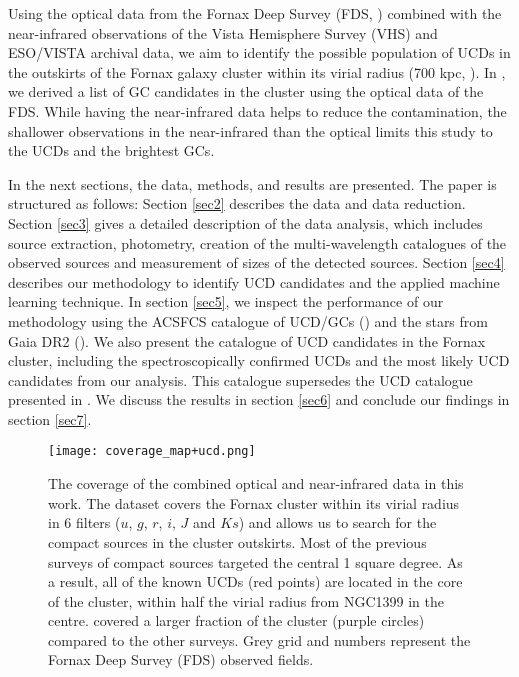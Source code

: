 \documentclass[fleqn,usenatbib]{mnras}
\begin{document}
Using the optical data from the Fornax Deep Survey (FDS, \citealp{Iodice-2016,venhola2018}) combined with the near-infrared observations of the Vista Hemisphere Survey (VHS) and ESO/VISTA archival data, we aim to identify the possible population of UCDs in the outskirts of the Fornax galaxy cluster within its virial radius (700 kpc, \citealp{drinkwater2001}). In \citet{Cantiello2018}, we derived a list of GC candidates in the cluster using the optical data of the FDS. While having the near-infrared data helps to reduce the contamination, the shallower observations in the near-infrared than the optical limits this study to the UCDs and the brightest GCs. 

In the next sections, the data, methods, and results are presented. The paper is structured as follows: Section \ref{sec2} describes the data and data reduction. Section \ref{sec3} gives a detailed description of the data analysis, which includes source extraction, photometry, creation of the multi-wavelength catalogues of the observed sources and measurement of sizes of the detected sources. Section \ref{sec4} describes our methodology to identify UCD candidates and the applied machine learning technique. In section \ref{sec5}, we inspect the performance of our methodology using the ACSFCS catalogue of UCD/GCs (\citealp{jordan2015}) and the stars from Gaia DR2 (\citealp{gaia}). We also present the catalogue of UCD candidates in the Fornax cluster, including the spectroscopically confirmed UCDs and the most likely UCD candidates from our analysis. This catalogue supersedes the UCD catalogue presented in \citealp{Cantiello2020}. We discuss the results in section \ref{sec6} and conclude our findings in section \ref{sec7}. 

\begin{figure*}
\centering
        \texttt{[image: coverage\_map+ucd.png]}
\caption{The coverage of the combined optical and near-infrared data in this work. The dataset covers the Fornax cluster within its virial radius in 6 filters ($u$, $g$, $r$, $i$, $J$ and $Ks$) and allows us to search for the compact sources in the cluster outskirts. Most of the previous surveys of compact sources targeted the central 1 square degree. As a result, all of the known UCDs (red points) are located in the core of the cluster, within half the virial radius from NGC1399 in the centre. \citet{drinkwater2000} covered a larger fraction of the cluster (purple circles) compared to the other surveys. Grey grid and numbers represent the Fornax Deep Survey (FDS) observed fields.}
\label{coverage}
\end{figure*}
\end{document}

